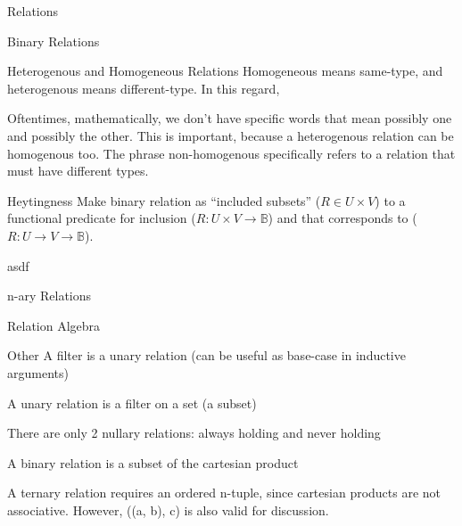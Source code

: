 \begin{part}{Relations}
    \begin{chapter}{Binary Relations}
        \begin{section}{Heterogenous and Homogeneous Relations}
            Homogeneous means same-type, and heterogenous means different-type. In this regard, 
            
            Oftentimes, mathematically, we don't have specific words that mean possibly one and possibly the other. This is important, because a heterogenous relation can be homogenous too. The phrase non-homogenous specifically refers to a relation that must have different types.
        \end{section}
        
        \begin{section}{Heytingness}
            Make binary relation as ``included subsets'' ($R \in U\times V$) to a functional predicate for inclusion ($R : U \times V \to \mathbb{B}$) and that corresponds to ($R:U\to V \to \mathbb{B}$).
        \end{section}
        
        \begin{section}{asdf}
        \end{section}
    \end{chapter}
    
    \begin{chapter}{n-ary Relations}
    
    \end{chapter}
    
    \begin{chapter}{Relation Algebra}
    
    \end{chapter}
    
    \begin{chapter}{Other}
        A filter is a unary relation (can be useful as base-case in inductive arguments)
        
        A unary relation is a filter on a set (a subset)
        
        There are only 2 nullary relations: always holding and never holding
        
        A binary relation is a subset of the cartesian product
        
        A ternary relation requires an ordered n-tuple, since cartesian products are not associative. However, ((a, b), c) is also valid for discussion.
        
        
    \end{chapter}
\end{part}  